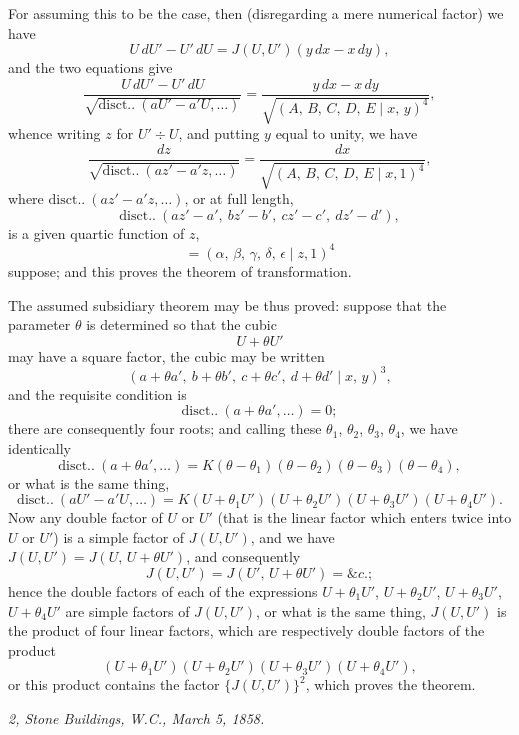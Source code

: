 \documentclass[11pt]{article}
\providecommand{\disct}{\mathrm{disct.}}
\begin{document}
For assuming this to be the case, then (disregarding a mere numerical factor) we have
\[
U\,dU' - U'\,dU = J(U,U')(y\,dx - x\,dy),
\]
and the two equations give
\[
\frac{U\,dU' - U'\,dU}{\sqrt{\disct.\ (aU' - a'U, \ldots)}} = \frac{y\,dx - x\,dy}{\sqrt{(A,\,B,\,C,\,D,\,E \mid x,\,y)^4}},
\]
whence writing $z$ for $U' \div U$, and putting $y$ equal to unity, we have
\[
\frac{dz}{\sqrt{\disct.\ (az' - a'z, \ldots)}} = \frac{dx}{\sqrt{(A,\,B,\,C,\,D,\,E \mid x, 1)^4}},
\]
where $\disct.\ (az' - a'z, \ldots)$, or at full length,
\[
\disct.\ (az' - a',\ bz' - b',\ cz' - c',\ dz' - d'),
\]
is a given quartic function of $z$,
\[
=(\alpha,\,\beta,\,\gamma,\,\delta,\,\epsilon \mid z, 1)^4
\]
suppose; and this proves the theorem of transformation.

\medskip

The assumed subsidiary theorem may be thus proved: suppose that the parameter $\theta$ is determined so that the cubic
\[
U + \theta U'
\]
may have a square factor, the cubic may be written
\[
(a + \theta a',\ b + \theta b',\ c + \theta c',\ d + \theta d' \mid x,\,y)^3,
\]
and the requisite condition is
\[
\disct.\ (a + \theta a', \ldots) = 0;
\]
there are consequently four roots; and calling these $\theta_1$, $\theta_2$, $\theta_3$, $\theta_4$, we have identically
\[
\disct.\ (a + \theta a', \ldots) = K(\theta - \theta_1)(\theta - \theta_2)(\theta - \theta_3)(\theta - \theta_4),
\]
or what is the same thing,
\[
\disct.\ (aU' - a'U, \ldots) = K(U + \theta_1 U')(U + \theta_2 U')(U + \theta_3 U')(U + \theta_4 U').
\]
Now any double factor of $U$ or $U'$ (that is the linear factor which enters twice into $U$ or $U'$) is a simple factor of $J(U,U')$, and we have $J(U,U') = J(U,\,U + \theta U')$, and consequently
\[
J(U,U') = J(U',\,U + \theta U') = \&c.;
\]
hence the double factors of each of the expressions $U + \theta_1 U'$, $U + \theta_2 U'$, $U + \theta_3 U'$, $U + \theta_4 U'$ are simple factors of $J(U,U')$, or what is the same thing, $J(U,U')$ is the product of four linear factors, which are respectively double factors of the product
\[
(U + \theta_1 U')(U + \theta_2 U')(U + \theta_3 U')(U + \theta_4 U'),
\]
or this product contains the factor $\{J(U,U')\}^2$, which proves the theorem.

\medskip

\noindent\textit{2, Stone Buildings, W.C., March 5, 1858.}

\bigskip

\end{document}
